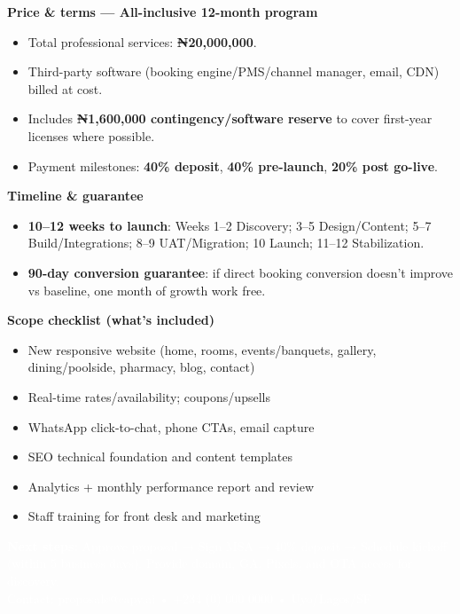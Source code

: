 \documentclass[11pt,a4paper]{article}
\begin{document}
\vspace{0.1em}
\begin{minipage}[t]{0.53\textwidth}
\textbf{\color{wbBlue}Price \& terms — All-inclusive 12-month program}
\begin{itemize}
  \item Total professional services: \textbf{₦20,000,000}.
  \item Third-party software (booking engine/PMS/channel manager, email, CDN) billed at cost.
  \item Includes \textbf{₦1,600,000 contingency/software reserve} to cover first-year licenses where possible.
  \item Payment milestones: \textbf{40\% deposit}, \textbf{40\% pre-launch}, \textbf{20\% post go-live}.
\end{itemize}
\end{minipage}\hfill
\begin{minipage}[t]{0.44\textwidth}
\textbf{\color{wbBlue}Timeline \& guarantee}
\begin{itemize}
  \item \textbf{10–12 weeks to launch}:\newline
  Weeks 1–2 Discovery; 3–5 Design/Content; 5–7 Build/Integrations; 8–9 UAT/Migration; 10 Launch; 11–12 Stabilization.
  \item \textbf{90-day conversion guarantee}: if direct booking conversion doesn’t improve vs baseline, one month of growth work free.
\end{itemize}
\end{minipage}

\vspace{0.2em}
\textbf{\color{wbBlue}Scope checklist (what’s included)}
\begin{multicols}{2}
\begin{itemize}
  \item New responsive website (home, rooms, events/banquets, gallery, dining/poolside, pharmacy, blog, contact)
  \item Real-time rates/availability; coupons/upsells
  \item WhatsApp click-to-chat, phone CTAs, email capture
  \item SEO technical foundation and content templates
  \item Analytics + monthly performance report and review
  \item Staff training for front desk and marketing
\end{itemize}
\end{multicols}

\vspace{0.2em}
\noindent\colorbox{wbRed}{\parbox{\dimexpr\textwidth-2\fboxsep\relax}{\vspace{8pt}
\textcolor{white}{\textbf{Next steps:} Approve proposal → Sign MSA → 40\% deposit → Schedule kickoff (within 5 business days). Provide domain, GA, Pixels, and OTA access for discovery.}\\[2pt]
\textcolor{white}{\small Contact: proposals@capy.ai • +234 (0) 000 0000 • Uyo/Lagos/SF}\vspace{6pt}}}
\end{document}
